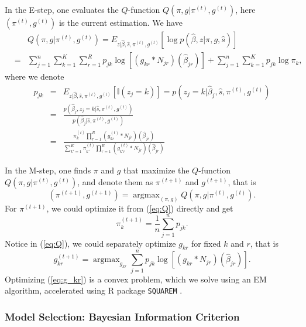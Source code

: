 \documentclass[11pt]{article}
\DeclareMathOperator*{\argmax}{argmax}
\begin{document}
In the E-step, one evaluates the $Q$-function $Q(\pi,g|\pi^{(t)},g^{(t)})$, here $(\pi^{(t)},g^{(t)})$ is the current estimation. We have
\begin{eqnarray}
    &&Q(\pi,g|\pi^{(t)},g^{(t)}) = E_{z|\hat\beta,\hat s,\pi^{(t)},g^{(t)}}\left[\log p(\hat\beta,z|\pi,g,\hat s)\right]\nonumber\\
    &=&\sum_{j=1}^n\sum_{k=1}^K\sum_{r=1}^Rp_{jk}\log \left[(g_{kr}*N_{jr})(\hat\beta_{jr}) \right]+\sum_{j=1}^n\sum_{k=1}^Kp_{jk}\log\pi_k,
\label{eq:Q}
\end{eqnarray}
where we denote
\begin{eqnarray}
    p_{jk}&=&E_{z|\hat\beta,\hat s,\pi^{(t)},g^{(t)}}[\mathbb{I}(z_j=k)]=p(z_j=k|\hat\beta_j,\hat s,\pi^{(t)},g^{(t)})\nonumber\\
    &=& \frac{p(\hat\beta_j,z_j=k|\hat s,\pi^{(t)},g^{(t)})}{p(\hat\beta_j|\hat s,\pi^{(t)},g^{(t)})}\nonumber\\
    &=& \frac{\pi_k^{(t)}\prod_{r=1}^R(g_{kr}^{(t)}*N_{jr})(\hat\beta_{jr})}{\sum_{k'=1}^K\pi_{k'}^{(t)}\prod_{r=1}^R(g_{k'r}^{(t)}*N_{jr})(\hat\beta_{jr})}
\end{eqnarray}

In the M-step, one finds $\pi$ and $g$ that maximize the $Q$-function $Q(\pi,g|\pi^{(t)},g^{(t)})$, and denote them as $\pi^{(t+1)}$ and $g^{(t+1)}$, that is 
\begin{equation}
(\pi^{(t+1)}, g^ {(t+1)}) =\argmax_{(\pi,g)} Q(\pi,g|\pi^{(t)},g^{(t)}).
\end{equation}
For $\pi^{(t+1)}$, we could optimize it from (\ref{eq:Q}) directly and get
\begin{equation}
    \pi_k^{(t+1)} = \frac{1}{n} \sum_{j=1}^n p_{jk}.
\end{equation}
Notice in (\ref{eq:Q}), we could separately optimize $g_{kr}$ for fixed $k$ and $r$, that is 
\begin{equation}
    g_{kr}^ {(t+1)}=\argmax_{g_{kr}}\sum_{j=1}^np_{jk}\log \left[(g_{kr}*N_{jr})(\hat\beta_{jr}) \right].
\label{eq:g_kr}
\end{equation}
Optimizing (\ref{eq:g_kr}) is a convex problem, which we solve using an EM algorithm, accelerated using R package {\tt SQUAREM} .

\subsubsection{Model Selection: Bayesian Information Criterion}
\end{document}
